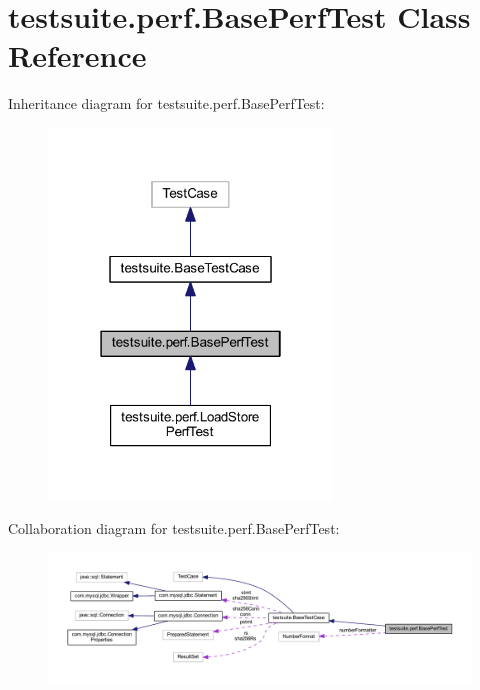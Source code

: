 \hypertarget{classtestsuite_1_1perf_1_1_base_perf_test}{}\section{testsuite.\+perf.\+Base\+Perf\+Test Class Reference}
\label{classtestsuite_1_1perf_1_1_base_perf_test}


Inheritance diagram for testsuite.\+perf.\+Base\+Perf\+Test\+:
\nopagebreak
\begin{figure}[H]
\begin{center}
\leavevmode
\includegraphics[width=214pt]{classtestsuite_1_1perf_1_1_base_perf_test__inherit__graph}
\end{center}
\end{figure}


Collaboration diagram for testsuite.\+perf.\+Base\+Perf\+Test\+:
\nopagebreak
\begin{figure}[H]
\begin{center}
\leavevmode
\includegraphics[width=350pt]{classtestsuite_1_1perf_1_1_base_perf_test__coll__graph}
\end{center}
\end{figure}
